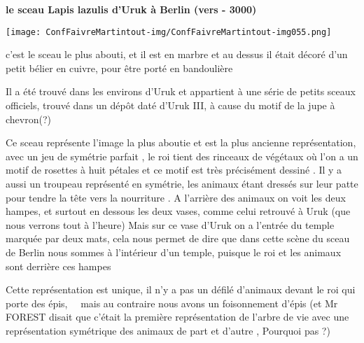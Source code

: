 \documentclass[a4paper]{article}
\begin{document}
\bigskip


\bigskip


\bigskip


\bigskip


\bigskip


\bigskip


\bigskip


\bigskip


\bigskip


\bigskip

{
\textbf{le sceau Lapis lazulis d'Uruk à Berlin (vers - 3000)}}


\bigskip


\texttt{[image: ConfFaivreMartintout-img/ConfFaivreMartintout-img055.png]}



\bigskip

{
c'est le sceau le plus abouti, et il est en marbre et au dessus il était
décoré d'un petit bélier en cuivre, pour être porté en bandoulière}

{
Il a été trouvé dans les environs d'Uruk et appartient à une série de
petits sceaux officiels, trouvé dans un dépôt daté d'Uruk III, à cause
du motif de la jupe à chevron(?)}


\bigskip


\bigskip

{
Ce sceau représente l'image la plus aboutie et est la plus ancienne
représentation, avec un jeu de symétrie parfait , le roi tient des
rinceaux de végétaux où l'on a un motif de rosettes à huit pétales et
ce motif est très précisément dessiné . Il y a aussi un troupeau
représenté en symétrie, les animaux étant dressés sur leur patte pour
tendre la tête vers la nourriture . A l'arrière des animaux on voit les
deux hampes, et surtout en dessous les deux vases, comme celui retrouvé
à Uruk (que nous verrons tout à l'heure) Mais sur ce vase d'Uruk on a
l'entrée du temple marquée par deux mats, cela nous permet de dire que
dans cette scène du sceau de Berlin nous sommes à l'intérieur d'un
temple, puisque le roi et les animaux sont derrière ces hampes}


\bigskip

{
Cette représentation est unique, il n'y a pas un défilé d'animaux devant
le roi qui porte des épis, \ \ mais au contraire nous avons un
foisonnement d'épis (et Mr FOREST disait que c'était la première
représentation de l'arbre de vie avec une représentation symétrique des
animaux de part et d'autre , Pourquoi pas ?)}
\end{document}
